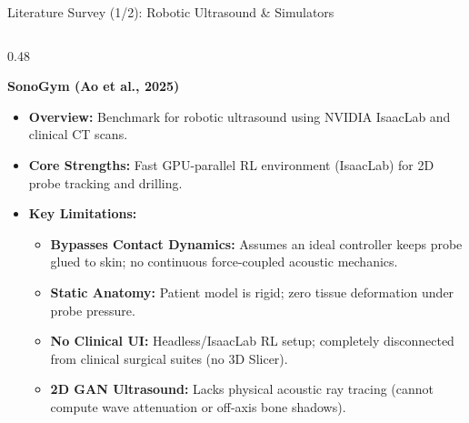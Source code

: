\documentclass{if-beamer}
\begin{document}
\begin{frame}{Literature Survey (1/2): Robotic Ultrasound \& Simulators}
    \begin{columns}[T]
        \begin{column}{0.48\textwidth}
            \begin{block}{\textbf{SonoGym (Ao et al., 2025)}}
                \begin{itemize}\itemsep=3pt
                    \item \textbf{Overview:} Benchmark for robotic ultrasound using NVIDIA IsaacLab and clinical CT scans.
                    \item \textbf{Core Strengths:} Fast GPU-parallel RL environment (IsaacLab) for 2D probe tracking and drilling.
                    \item \textcolor{accentorange}{\textbf{Key Limitations:}}
                    \begin{itemize}\itemsep=2pt
                        \item \textbf{Bypasses Contact Dynamics:} Assumes an ideal controller keeps probe glued to skin; no continuous force-coupled acoustic mechanics.
                        \item \textbf{Static Anatomy:} Patient model is rigid; zero tissue deformation under probe pressure.
                        \item \textbf{No Clinical UI:} Headless/IsaacLab RL setup; completely disconnected from clinical surgical suites (no 3D Slicer).
                        \item \textbf{2D GAN Ultrasound:} Lacks physical acoustic ray tracing (cannot compute wave attenuation or off-axis bone shadows).
                    \end{itemize}
                \end{itemize}
            \end{block}
        \end{column}


\end{columns}
\end{frame}
\end{document}
